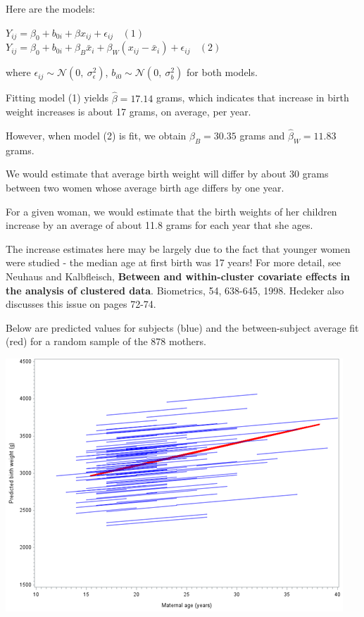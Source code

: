 \documentclass[
  9pt,
  ignorenonframetext,
]{beamer}
\begin{document}
\begin{frame}{}
\protect\hypertarget{section-3}{}
Here are the models:

\(Y_{ij}= \beta_0+b_{0i}+\beta x_{ij}+\epsilon _{ij} \ \ \ \ (1)\)\\
\(Y_{ij}= \beta_0+b_{0i}+ \beta_B \bar x_i+ \beta_W (x_{ij}-\bar x_i)+\epsilon _{ij} \ \ \ \ (2)\)

where \(\epsilon _{ij}\sim \mathcal N(0,\ \sigma_\epsilon ^2)\),
\(b_{i0}\sim \mathcal N(0,\ \sigma_b^2)\) for both models.

Fitting model (1) yields \(\hat \beta=17.14\) grams, which indicates
that increase in birth weight increases is about 17 grams, on average,
per year.

However, when model (2) is fit, we obtain \(\hat \beta_B=30.35\) grams
and \(\hat \beta_W=11.83\) grams.

We would estimate that average birth weight will differ by about 30
grams between two women whose average birth age differs by one year.

For a given woman, we would estimate that the birth weights of her
children increase by an average of about 11.8 grams for each year that
she ages.
\end{frame}

\begin{frame}{}
\protect\hypertarget{section-4}{}
The increase estimates here may be largely due to the fact that younger
women were studied - the median age at first birth was 17 years! For
more detail, see Neuhaus and Kalbfleisch, \textbf{Between and
within-cluster covariate effects in the analysis of clustered data}.
Biometrics, 54, 638-645, 1998. Hedeker also discusses this issue on
pages 72-74.

Below are predicted values for subjects (blue) and the between-subject
average fit (red) for a random sample of the 878 mothers.

\begin{center}\includegraphics[width=0.7\linewidth]{figs_L19/f1} \end{center}
\end{frame}
\end{document}
